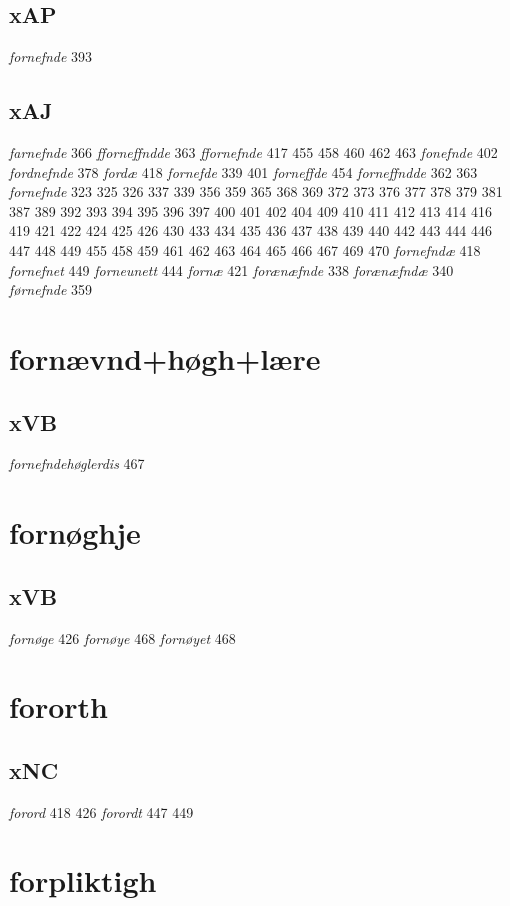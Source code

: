 \documentclass[a4paper,twocolumn]{article}
\begin{document}
\subsection{xAP}
\label{sec:org3bfeecb}
\emph{fornefnde} 393 
\subsection{xAJ}
\label{sec:orgacad68f}
\emph{farnefnde} 366 \emph{fforneffndde} 363 \emph{ffornefnde} 417 455 458 460 462 463 \emph{fonefnde} 402 \emph{fordnefnde} 378 \emph{fordæ} 418 \emph{fornefde} 339 401 \emph{forneffde} 454 \emph{forneffndde} 362 363 \emph{fornefnde} 323 325 326 337 339 356 359 365 368 369 372 373 376 377 378 379 381 387 389 392 393 394 395 396 397 400 401 402 404 409 410 411 412 413 414 416 419 421 422 424 425 426 430 433 434 435 436 437 438 439 440 442 443 444 446 447 448 449 455 458 459 461 462 463 464 465 466 467 469 470 \emph{fornefndæ} 418 \emph{fornefnet} 449 \emph{forneunett} 444 \emph{fornæ} 421 \emph{forænæfnde} 338 \emph{forænæfndæ} 340 \emph{førnefnde} 359 
\section{fornævnd+høgh+lære}
\label{sec:orgdbf6bbb}
\subsection{xVB}
\label{sec:org541360e}
\emph{fornefndehøglerdis} 467 
\section{fornøghje}
\label{sec:orgce66c7a}
\subsection{xVB}
\label{sec:orgebce41e}
\emph{fornøge} 426 \emph{fornøye} 468 \emph{fornøyet} 468 
\section{fororth}
\label{sec:org0795c44}
\subsection{xNC}
\label{sec:orgd833b9d}
\emph{forord} 418 426 \emph{forordt} 447 449 
\section{forpliktigh}
\label{sec:orgd5674f0}
\end{document}
